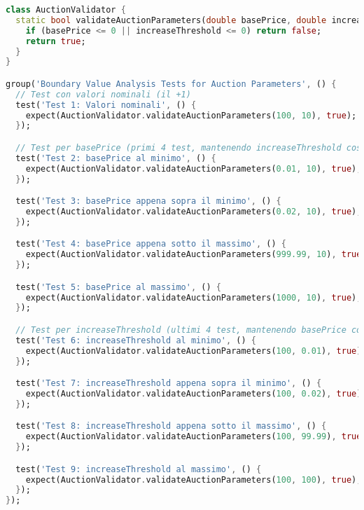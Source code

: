 \begin{lstlisting}[language=Dart]
class AuctionValidator {
  static bool validateAuctionParameters(double basePrice, double increaseThreshold) {
    if (basePrice <= 0 || increaseThreshold <= 0) return false;
    return true;
  }
}

group('Boundary Value Analysis Tests for Auction Parameters', () {
  // Test con valori nominali (il +1)
  test('Test 1: Valori nominali', () {
    expect(AuctionValidator.validateAuctionParameters(100, 10), true);
  });

  // Test per basePrice (primi 4 test, mantenendo increaseThreshold costante)
  test('Test 2: basePrice al minimo', () {
    expect(AuctionValidator.validateAuctionParameters(0.01, 10), true);
  });

  test('Test 3: basePrice appena sopra il minimo', () {
    expect(AuctionValidator.validateAuctionParameters(0.02, 10), true);
  });

  test('Test 4: basePrice appena sotto il massimo', () {
    expect(AuctionValidator.validateAuctionParameters(999.99, 10), true);
  });

  test('Test 5: basePrice al massimo', () {
    expect(AuctionValidator.validateAuctionParameters(1000, 10), true);
  });

  // Test per increaseThreshold (ultimi 4 test, mantenendo basePrice costante)
  test('Test 6: increaseThreshold al minimo', () {
    expect(AuctionValidator.validateAuctionParameters(100, 0.01), true);
  });

  test('Test 7: increaseThreshold appena sopra il minimo', () {
    expect(AuctionValidator.validateAuctionParameters(100, 0.02), true);
  });

  test('Test 8: increaseThreshold appena sotto il massimo', () {
    expect(AuctionValidator.validateAuctionParameters(100, 99.99), true);
  });

  test('Test 9: increaseThreshold al massimo', () {
    expect(AuctionValidator.validateAuctionParameters(100, 100), true);
  });
});
    \end{lstlisting}
